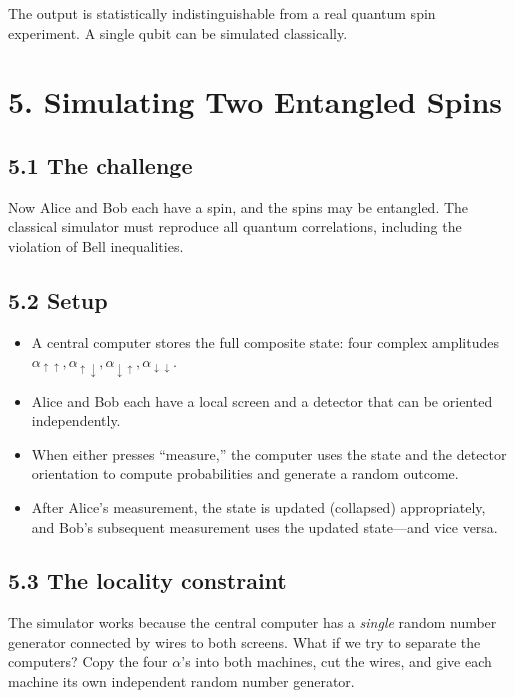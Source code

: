 \documentclass[12pt,a4paper]{article}
\begin{document}
The output is statistically indistinguishable from a real quantum spin experiment.  A single qubit can be simulated classically.

\section{5. Simulating Two Entangled Spins}

\subsection{5.1 The challenge}
Now Alice and Bob each have a spin, and the spins may be entangled.  The classical simulator must reproduce all quantum correlations, including the violation of Bell inequalities.

\subsection{5.2 Setup}
\begin{itemize}[nosep]
    \item A central computer stores the full composite state: four complex amplitudes $\alpha_{\uparrow\uparrow}, \alpha_{\uparrow\downarrow}, \alpha_{\downarrow\uparrow}, \alpha_{\downarrow\downarrow}$.
    \item Alice and Bob each have a local screen and a detector that can be oriented independently.
    \item When either presses ``measure,'' the computer uses the state and the detector orientation to compute probabilities and generate a random outcome.
    \item After Alice's measurement, the state is updated (collapsed) appropriately, and Bob's subsequent measurement uses the updated state---and vice versa.
\end{itemize}

\subsection{5.3 The locality constraint}
The simulator works because the central computer has a \emph{single} random number generator connected by wires to both screens.  What if we try to separate the computers?  Copy the four $\alpha$'s into both machines, cut the wires, and give each machine its own independent random number generator.
\end{document}

